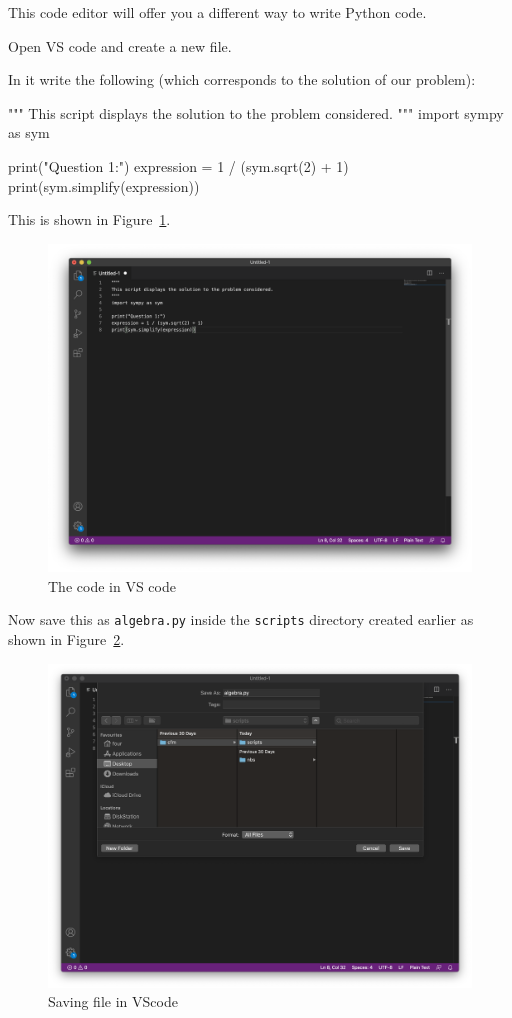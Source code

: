 This code editor will offer you a different way to write Python code.


Open VS code and create a new file.


In it write the following (which corresponds to the solution of our problem):

\begin{pyin}
"""
This script displays the solution to the problem considered.
"""
import sympy as sym

print("Question 1:")
expression = 1 / (sym.sqrt(2) + 1)
print(sym.simplify(expression))
\end{pyin}


This is shown in Figure~\ref{fig:code_in_vscode}.

\begin{figure}[!htbp]
\centering
\noindent\includegraphics[width=0.750\linewidth]{./assets/code_in_vscode/main.png}
\caption{The code in VS code}
\label{fig:code_in_vscode}
\end{figure}


Now save this as \texttt{algebra.py} inside the \texttt{scripts} directory created
earlier as shown in Figure~\ref{fig:saving_file_in_vscode}.

\begin{figure}[!htbp]
\centering
\noindent\includegraphics[width=0.750\linewidth]{./assets/saving_file_in_vscode/main.png}
\caption{Saving file in VScode}
\label{fig:saving_file_in_vscode}
\end{figure}


